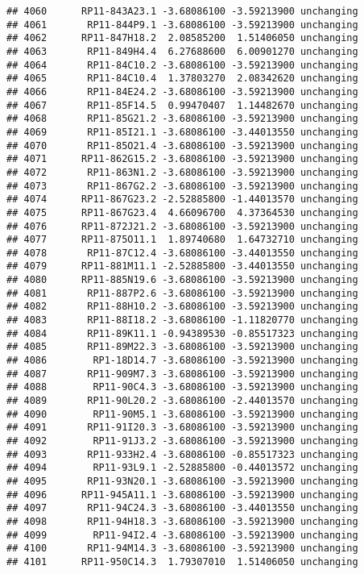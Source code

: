 \documentclass[]{article}
\begin{document}
\begin{verbatim}
## 4060      RP11-843A23.1 -3.68086100 -3.59213900 unchanging
## 4061       RP11-844P9.1 -3.68086100 -3.59213900 unchanging
## 4062      RP11-847H18.2  2.08585200  1.51406050 unchanging
## 4063       RP11-849H4.4  6.27688600  6.00901270 unchanging
## 4064       RP11-84C10.2 -3.68086100 -3.59213900 unchanging
## 4065       RP11-84C10.4  1.37803270  2.08342620 unchanging
## 4066       RP11-84E24.2 -3.68086100 -3.59213900 unchanging
## 4067       RP11-85F14.5  0.99470407  1.14482670 unchanging
## 4068       RP11-85G21.2 -3.68086100 -3.59213900 unchanging
## 4069       RP11-85I21.1 -3.68086100 -3.44013550 unchanging
## 4070       RP11-85O21.4 -3.68086100 -3.59213900 unchanging
## 4071      RP11-862G15.2 -3.68086100 -3.59213900 unchanging
## 4072       RP11-863N1.2 -3.68086100 -3.59213900 unchanging
## 4073       RP11-867G2.2 -3.68086100 -3.59213900 unchanging
## 4074      RP11-867G23.2 -2.52885800 -1.44013570 unchanging
## 4075      RP11-867G23.4  4.66096700  4.37364530 unchanging
## 4076      RP11-872J21.2 -3.68086100 -3.59213900 unchanging
## 4077      RP11-875O11.1  1.89740680  1.64732710 unchanging
## 4078       RP11-87C12.4 -3.68086100 -3.44013550 unchanging
## 4079      RP11-881M11.1 -2.52885800 -3.44013550 unchanging
## 4080      RP11-885N19.6 -3.68086100 -3.59213900 unchanging
## 4081       RP11-887P2.6 -3.68086100 -3.59213900 unchanging
## 4082       RP11-88H10.2 -3.68086100 -3.59213900 unchanging
## 4083       RP11-88I18.2 -3.68086100 -1.11820770 unchanging
## 4084       RP11-89K11.1 -0.94389530 -0.85517323 unchanging
## 4085       RP11-89M22.3 -3.68086100 -3.59213900 unchanging
## 4086        RP1-18D14.7 -3.68086100 -3.59213900 unchanging
## 4087       RP11-909M7.3 -3.68086100 -3.59213900 unchanging
## 4088        RP11-90C4.3 -3.68086100 -3.59213900 unchanging
## 4089       RP11-90L20.2 -3.68086100 -2.44013570 unchanging
## 4090        RP11-90M5.1 -3.68086100 -3.59213900 unchanging
## 4091       RP11-91I20.3 -3.68086100 -3.59213900 unchanging
## 4092        RP11-91J3.2 -3.68086100 -3.59213900 unchanging
## 4093       RP11-933H2.4 -3.68086100 -0.85517323 unchanging
## 4094        RP11-93L9.1 -2.52885800 -0.44013572 unchanging
## 4095       RP11-93N20.1 -3.68086100 -3.59213900 unchanging
## 4096      RP11-945A11.1 -3.68086100 -3.59213900 unchanging
## 4097       RP11-94C24.3 -3.68086100 -3.44013550 unchanging
## 4098       RP11-94H18.3 -3.68086100 -3.59213900 unchanging
## 4099        RP11-94I2.4 -3.68086100 -3.59213900 unchanging
## 4100       RP11-94M14.3 -3.68086100 -3.59213900 unchanging
## 4101      RP11-950C14.3  1.79307010  1.51406050 unchanging

\end{verbatim}
\end{document}
